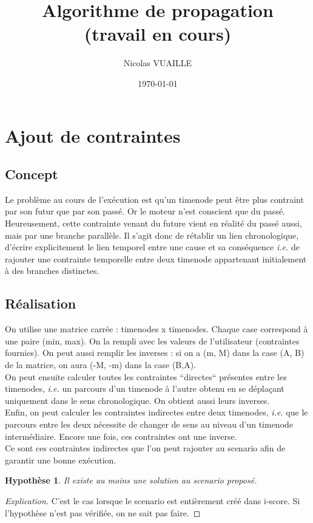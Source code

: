 \documentclass[10pt,a4paper]{article}
\author{Nicolas VUAILLE}
\title{Algorithme de propagation \\ (travail en cours)}
\date{\today}
\newtheorem{presup}{Hypothèse}
\begin{document}
\maketitle

\tableofcontents

\newpage

\section{Ajout de contraintes}

	\subsection{Concept}
Le problème au cours de l'exécution est qu'un timenode peut être plus contraint par son futur que par son passé. Or le moteur n'est conscient que du passé. Heureusement, cette contrainte venant du future vient en réalité du passé aussi, mais par une branche parallèle. Il s'agit donc de rétablir un lien chronologique, d'écrire explicitement le lien temporel entre une cause et sa conséquence \textit{i.e.} de rajouter une contrainte temporelle entre deux timenode appartenant initialement à des branches distinctes.
	
	\subsection{Réalisation}
On utilise une matrice carrée : timenodes x timenodes. Chaque case correspond à une paire (min, max). On la rempli avec les valeurs de l'utilisateur (contraintes fournies). On peut aussi remplir les inverses : si on a (m, M) dans la case (A, B) de la matrice, on aura (-M, -m) dans la case (B,A).\\
On peut ensuite calculer toutes les contraintes ``directes`` présentes entre les timenodes, \textit{i.e.} un parcours d'un timenode à l'autre obtenu en se déplaçant uniquement dans le sens chronologique. On obtient aussi leurs inverses.\\
Enfin, on peut calculer les contraintes indirectes entre deux timenodes, \textit{i.e.} que le parcours entre les deux nécessite de changer de sens au niveau d'un timenode intermédiaire. Encore une fois, ces contraintes ont une inverse.\\

Ce sont ces contraintes indirectes que l'on peut rajouter au scenario afin de garantir une bonne exécution.

	\begin{presup}
		Il existe au moins une solution au scenario proposé.
	\end{presup}
	\begin{proof}[Explication]
		C'est le cas lorsque le scenario est entièrement créé dans i-score. Si l'hypothèse n'est pas vérifiée, on ne sait pas faire.
	\end{proof}
\end{document}
